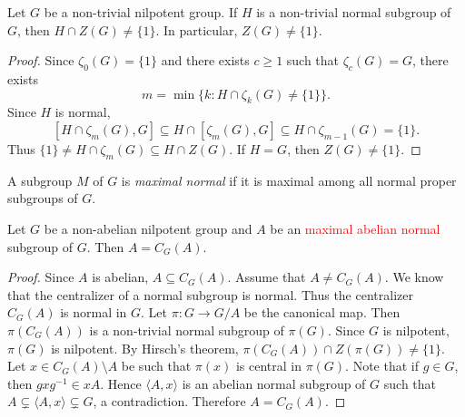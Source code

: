 \begin{theorem}[Hirsch]
	\label{thm:Z(nilpotent)}
	Let $G$ be a non-trivial nilpotent group. If $H$ is a non-trivial normal subgroup of $G$, then 
	$H\cap Z(G)\ne\{1\}$. In particular, $Z(G)\ne\{1\}$. 
\end{theorem}

\begin{proof}
	Since $\zeta_0(G)=\{1\}$ and there exists $c\geq 1$ such that $\zeta_c(G)=G$, there exists  
	\[
	m=\min\{k:H\cap\zeta_k(G)\ne\{1\}\}.
	\]
	Since $H$ is normal, 
	\[
	[H\cap\zeta_m(G),G]\subseteq H\cap[\zeta_m(G),G]\subseteq H\cap\zeta_{m-1}(G)=\{1\}.
	\]
	Thus $\{1\}\ne H\cap\zeta_m(G)\subseteq H\cap Z(G)$. If $H=G$, then $Z(G)\ne\{1\}$. 
\end{proof}



A subgroup $M$ of $G$ is {\em maximal normal} if it is maximal
among all normal proper subgroups of $G$.  

\begin{corollary}
	Let $G$ be a non-abelian nilpotent group and $A$ be an \textcolor{red}{maximal abelian normal} subgroup of $G$. Then $A=C_G(A)$.
\end{corollary}

\begin{proof}
	Since $A$ is abelian, $A\subseteq C_G(A)$. Assume that $A\ne C_G(A)$.
	We know that the centralizer of a normal subgroup is normal. Thus the centralizer $C_G(A)$ is normal in $G$. 
	Let $\pi\colon G\to G/A$ be the canonical map.
	Then $\pi(C_G(A))$ is a non-trivial normal subgroup of $\pi(G)$. Since 
	$G$ is nilpotent, $\pi(G)$ is nilpotent. By Hirsch's theorem, 
	$\pi(C_G(A))\cap Z(\pi(G))\ne\{1\}$. Let
	$x\in C_G(A)\setminus A$ be such that $\pi(x)$ is central in $\pi(G)$. 
	Note that if $g\in G$, then $gxg^{-1}\in xA$. 
	Hence 
	$\langle A,x\rangle$ is an abelian normal subgroup of $G$ such that   
	$A\subsetneq \langle
	A,x\rangle\subsetneq G$, a contradiction. Therefore $A=C_G(A)$. 
\end{proof}


